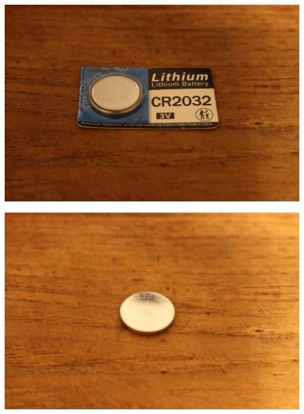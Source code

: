 \documentclass{article}
\begin{document}
\begin{minipage}[b]{0.5\textwidth}
	\includegraphics[width=\textwidth]{Bilder2024/IMG_0075.JPG}
\end{minipage}
\begin{minipage}[b]{0.5\textwidth}
	\includegraphics[width=\textwidth]{Bilder2024/IMG_0077.JPG}
\end{minipage}

\vspace{0.5cm}
\end{document}
